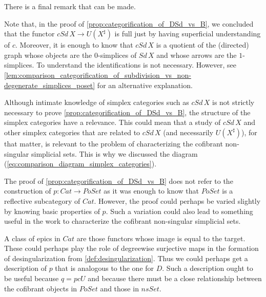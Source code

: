 There is a final remark that can be made.
\begin{remark}
Note that, in the proof of \cref{prop:categorification_of_DSd_vs_B}, we concluded that the functor $cSd\, X\to U(X^\sharp )$ is full just by having superficial understanding of $c$. Moreover, it is enough to know that $cSd\, X$ is a quotient of the (directed) graph whose objects are the $0$-simplices of $Sd\, X$ and whose arrows are the $1$-simplices. To understand the identifications is not necessary. However, see \cref{lem:comparison_categorification_of_subdivision_vs_non-degenerate_simplices_poset} for an alternative explanation.

Although intimate knowledge of simplex categories such as $cSd\, X$ is not strictly necessary to prove \cref{prop:categorification_of_DSd_vs_B}, the structure of the simplex categories have a relevance. This could mean that a study of $cSd\, X$ and other simplex categories that are related to $cSd\, X$ (and necessarily $U(X^\sharp )$), for that matter, is relevant to the problem of characterizing the cofibrant non-singular simplicial sets. This is why we discussed the diagram (\ref{eq:comparison_diagram_simplex_categories}).

The proof of \cref{prop:categorification_of_DSd_vs_B} does not refer to the construction of $p:Cat\to PoSet$ as it was enough to know that $PoSet$ is a reflective subcategory of $Cat$. However, the proof could perhaps be varied slightly by knowing basic properties of $p$. Such a variation could also lead to something useful in the work to characterize the cofibrant non-singular simplicial sets.

A class of epics in $Cat$ are those functors whose image is equal to the target. These could perhaps play the role of degreewise surjective maps in the formation of desingularization from \cref{def:desingularization}. Thus we could perhaps get a description of $p$ that is analogous to the one for $D$. Such a description ought to be useful because $q=pcU$ and because there must be a close relationship between the cofibrant objects in $PoSet$ and those in $nsSet$.
\end{remark}






